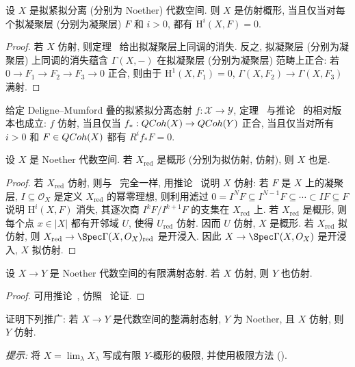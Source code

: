 \begin{corollary}\label{src:5.5.17}
设 $X$ 是拟紧拟分离 (分别为 Noether) 代数空间. 则 $X$ 是仿射概形, 当且仅当对每个拟凝聚层 (分别为凝聚层) $F$ 和 $i>0$, 都有 $\mathrm H^i(X,F)=0$.
\end{corollary}
\begin{proof}
若 $X$ 仿射, 则定理~ 给出拟凝聚层上同调的消失. 反之, 拟凝聚层 (分别为凝聚层) 上同调的消失蕴含 $\Gamma(X,-)$ 在拟凝聚层 (分别为凝聚层) 范畴上正合: 若 $0\to F_1\to F_2\to F_3\to0$ 正合, 则由于 $\mathrm H^1(X,F_1)=0$, $\Gamma(X,F_2)\to\Gamma(X,F_3)$ 满射.
\end{proof}
\begin{remark}\label{src:5.5.18}
给定 Deligne--Mumford 叠的拟紧拟分离态射 $f:\mathcal X\to\mathcal Y$, 定理~ 与推论~ 的相对版本也成立: $f$ 仿射, 当且仅当 $f_*:QCoh(X)\to QCoh(Y)$ 正合, 当且仅当对所有 $i>0$ 和 $F\in QCoh(X)$ 都有 $R^if_*F=0$.
\end{remark}
\begin{proposition}\label{src:5.5.19}
设 $X$ 是 Noether 代数空间. 若 $X_{\mathrm{red}}$ 是概形 (分别为拟仿射, 仿射), 则 $X$ 也是.
\end{proposition}
\begin{proof}
若 $X_{\mathrm{red}}$ 仿射, 则与~\cite[习题 III.3.1]{Har77} 完全一样, 用推论~ 说明 $X$ 仿射: 若 $F$ 是 $X$ 上的凝聚层, $I\subseteq\mathcal O_X$ 是定义 $X_{\mathrm{red}}$ 的幂零理想, 则利用滤过 $0=I^NF\subseteq I^{N-1}F\subseteq\cdots\subset IF\subseteq F$ 说明 $\mathrm H^i(X,F)$ 消失, 其逐次商 $I^kF/I^{k+1}F$ 的支集在 $X_{\mathrm{red}}$ 上. 若 $X_{\mathrm{red}}$ 是概形, 则每个点 $x\in|X|$ 都有开邻域 $U$, 使得 $U_{\mathrm{red}}$ 仿射. 因而 $U$ 仿射, $X$ 是概形. 若 $X_{\mathrm{red}}$ 拟仿射, 则 $X_{\mathrm{red}}\to\Spec\Gamma(X,\mathcal O_X)_{\mathrm{red}}$ 是开浸入. 因此 $X\to\Spec\Gamma(X,\mathcal O_X)$ 是开浸入, $X$ 拟仿射.
\end{proof}
\begin{theorem}\label{src:5.5.20}
设 $X\to Y$ 是 Noether 代数空间的有限满射态射. 若 $X$ 仿射, 则 $Y$ 也仿射.
\end{theorem}
\begin{proof}
可用推论~, 仿照~\cite[习题 $4.1$]{Har77} 论证.
\end{proof}
\begin{exercise}\label{src:5.5.21}
证明下列推广: 若 $X\to Y$ 是代数空间的整满射态射, $Y$ 为 Noether, 且 $X$ 仿射, 则 $Y$ 仿射.

\textit{提示:} 将 $X=\lim_\lambda X_\lambda$ 写成有限 $Y$-概形的极限, 并使用极限方法 ().
\end{exercise}
